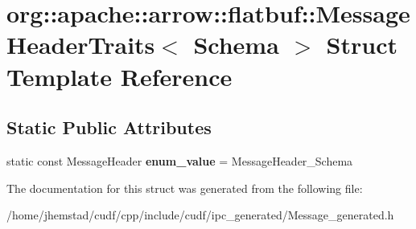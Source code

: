 \hypertarget{structorg_1_1apache_1_1arrow_1_1flatbuf_1_1MessageHeaderTraits_3_01Schema_01_4}{}\section{org\+:\+:apache\+:\+:arrow\+:\+:flatbuf\+:\+:Message\+Header\+Traits$<$ Schema $>$ Struct Template Reference}
\label{structorg_1_1apache_1_1arrow_1_1flatbuf_1_1MessageHeaderTraits_3_01Schema_01_4}
\subsection*{Static Public Attributes}
\begin{DoxyCompactItemize}
\item 
static const Message\+Header {\bfseries enum\+\_\+value} = Message\+Header\+\_\+\+Schema\hypertarget{structorg_1_1apache_1_1arrow_1_1flatbuf_1_1MessageHeaderTraits_3_01Schema_01_4_a7ad3d1c45faccb213ac63d5222df22ae}{}\label{structorg_1_1apache_1_1arrow_1_1flatbuf_1_1MessageHeaderTraits_3_01Schema_01_4_a7ad3d1c45faccb213ac63d5222df22ae}

\end{DoxyCompactItemize}


The documentation for this struct was generated from the following file\+:\begin{DoxyCompactItemize}
\item 
/home/jhemstad/cudf/cpp/include/cudf/ipc\+\_\+generated/Message\+\_\+generated.\+h\end{DoxyCompactItemize}
